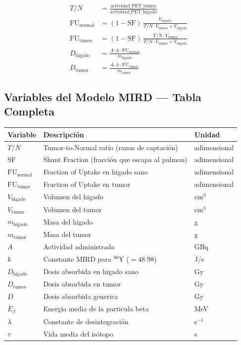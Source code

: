 \documentclass[12pt,a4paper]{article}
\begin{document}
\begin{align}
    T/N &= \frac{\text{actividad\_PET\_tumor}}{\text{actividad\_PET\_higado}} \\
    \text{FU}_{\text{normal}} &= (1 - \text{SF})\,
          \frac{V_{\text{higado}}}{T/N \cdot V_{\text{tumor}} + V_{\text{higado}}} \\
    \text{FU}_{\text{tumor}} &= (1 - \text{SF})\,
          \frac{T/N \cdot V_{\text{tumor}}}{T/N \cdot V_{\text{tumor}} + V_{\text{higado}}} \\
    D_{\text{higado}} &= \frac{A \cdot k \cdot \text{FU}_{\text{normal}}}{m_{\text{higado}}} \\
    D_{\text{tumor}} &= \frac{A \cdot k \cdot \text{FU}_{\text{tumor}}}{m_{\text{tumor}}}
\end{align}

\subsection{Variables del Modelo MIRD --- Tabla Completa}

\begin{table}[H]
\centering
\begin{tabular}{lll}
\toprule
\textbf{Variable} & \textbf{Descripción} & \textbf{Unidad} \\
\midrule
$T/N$ & Tumor-to-Normal ratio (razon de captación) & adimensional \\
SF & Shunt Fraction (fracción que escapa al pulmon) & adimensional \\
$\text{FU}_{\text{normal}}$ & Fraction of Uptake en higado sano & adimensional \\
$\text{FU}_{\text{tumor}}$ & Fraction of Uptake en tumor & adimensional \\
$V_{\text{higado}}$ & Volumen del higado & cm$^3$ \\
$V_{\text{tumor}}$ & Volumen del tumor & cm$^3$ \\
$m_{\text{higado}}$ & Masa del higado & g \\
$m_{\text{tumor}}$ & Masa del tumor & g \\
$A$ & Actividad administrada & GBq \\
$k$ & Constante MIRD para $^{90}$Y ($= 48.98$) & J/s \\
$D_{\text{higado}}$ & Dosis absorbida en higado sano & Gy \\
$D_{\text{tumor}}$ & Dosis absorbida en tumor & Gy \\
$D$ & Dosis absorbida generica & Gy \\
$\bar{E}_\beta$ & Energia media de la particula beta & MeV \\
$\lambda$ & Constante de desintegración & s$^{-1}$ \\
$\tau$ & Vida media del isótopo & s \\
\bottomrule
\end{tabular}
\end{table}
\end{document}
